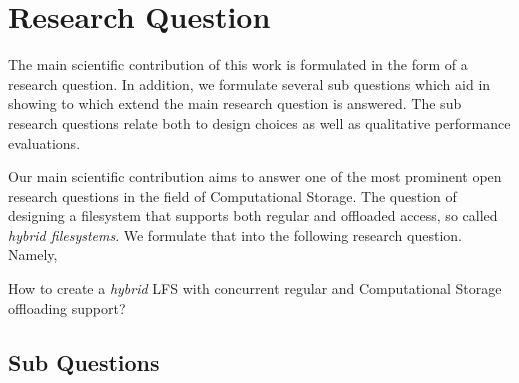 \section{Research Question}

The main scientific contribution of this work is formulated in the form of a
research question. In addition, we formulate several sub questions which aid in
showing to which extend the main research question is answered. The sub research
questions relate both to design choices as well as qualitative performance
evaluations.

Our main scientific contribution aims to answer one of the most prominent open
research questions in the field of Computational Storage. The question of
designing a filesystem that supports both regular and offloaded access, so
called \textit{hybrid filesystems}. We formulate that into the following
research question. Namely,

\begin{displayquote}
    How to create a \textit{hybrid} LFS with concurrent regular and 
    Computational Storage offloading support?
\end{displayquote}

\subsection{Sub Questions}


